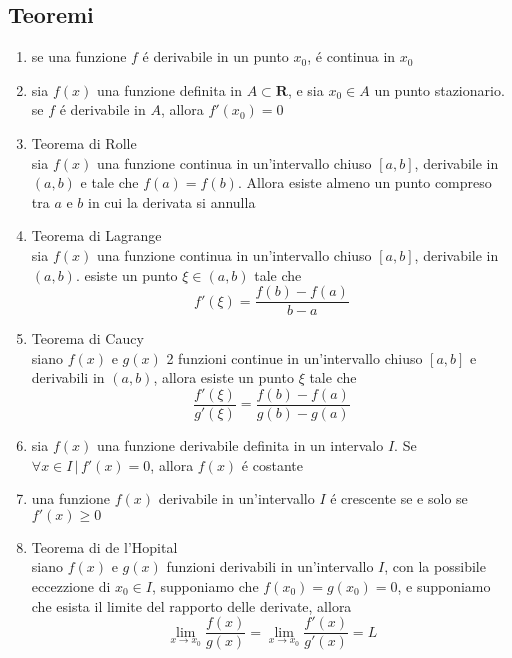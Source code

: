 \documentclass{exam}
\begin{document}
  \subsection{Teoremi}
    \begin{enumerate}
      \item
        se una funzione $f$ \'e derivabile in un punto $x_{0}$, \'e continua in $x_{0}$
      \item 
        sia $f(x)$ una funzione definita in $A\subset \mathbf{R}$, e sia $x_{0}\in A$ un punto stazionario. se $f$ \'e derivabile in $A$, allora $f'(x_{0})=0$
      \item{Teorema di Rolle}\\
        sia $f(x)$ una funzione continua in un'intervallo chiuso $[a,b]$, derivabile in $(a,b)$ e tale che $f(a)=f(b)$. Allora esiste almeno un punto compreso tra $a$ e $b$ in cui la derivata si annulla
      \item{Teorema di Lagrange}\\
        sia $f(x)$ una funzione continua in un'intervallo chiuso $[a,b]$, derivabile in $(a,b)$. esiste un punto $\xi \in (a,b)$ tale che
        \begin{equation}
          f'(\xi)=\frac{f(b)-f(a)}{b-a}
        \end{equation}
      \item{Teorema di Caucy}\\
        siano $f(x)$ e $g(x)$ 2 funzioni continue in un'intervallo chiuso $[a,b]$ e derivabili in $(a,b)$, allora esiste un punto $\xi$ tale che
        \begin{equation}
          \frac{f'(\xi)}{g'(\xi)}=\frac{f(b)-f(a)}{g(b)-g(a)}
        \end{equation}
      \item
        sia $f(x)$ una funzione derivabile definita in un intervalo $I$. Se $\forall x\in I\,|\,f'(x)=0$, allora $f(x)$ \'e costante
      \item
        una funzione $f(x)$ derivabile in un'intervallo $I$ \'e crescente se e solo se $f'(x)\ge 0$
      \item{Teorema di de l'Hopital}\\
        siano $f(x)$ e $g(x)$ funzioni derivabili in un'intervallo $I$, con la possibile eccezzione di $x_{0}\in I$, supponiamo che $f(x_{0})=g(x_{0})=0$, e supponiamo che esista il limite del rapporto delle derivate, allora
        \begin{equation}
          \lim_{x\to x_{0}}\frac{f(x)}{g(x)}=\lim_{x\to x_{0}}\frac{f'(x)}{g'(x)}=L
        \end{equation}
    \end{enumerate}
  \newpage
\end{document}
